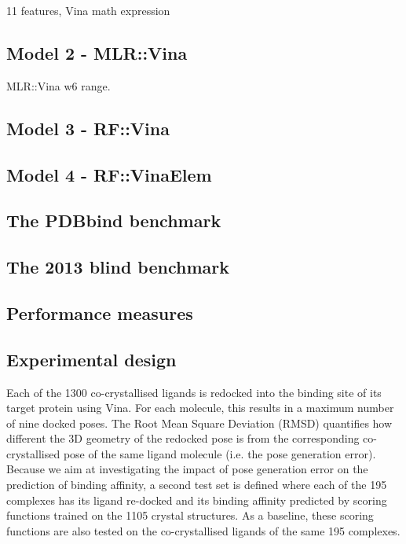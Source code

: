 11 features, Vina math expression

\subsection{Model 2 - MLR::Vina}

MLR::Vina w6 range.

\subsection{Model 3 - RF::Vina}

\subsection{Model 4 - RF::VinaElem}

\subsection{The PDBbind benchmark}

\subsection{The 2013 blind benchmark}

\subsection{Performance measures}


\subsection{Experimental design}

Each of the 1300 co-crystallised ligands is redocked into the binding site of its target protein using Vina. For each molecule, this results in a maximum number of nine docked poses. The Root Mean Square Deviation (RMSD) quantifies how different the 3D geometry of the redocked pose is from the corresponding co-crystallised pose of the same ligand molecule (i.e. the pose generation error). Because we aim at investigating the impact of pose generation error on the prediction of binding affinity, a second test set is defined where each of the 195 complexes has its ligand re-docked and its binding affinity predicted by scoring functions trained on the 1105 crystal structures. As a baseline, these scoring functions are also tested on the co-crystallised ligands of the same 195 complexes.

